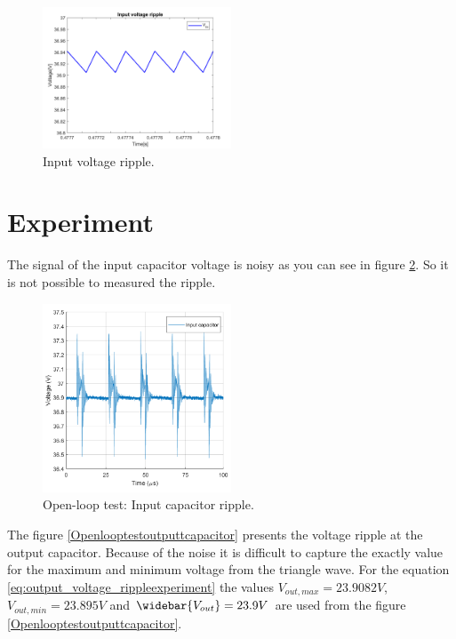 \begin{figure}[H]
	\begin{center}
		\includegraphics[width=0.5\textwidth]{../Pictures/P1/Open_loop_simulation/open_loop_Vin_ripple.png}
		\caption{Input voltage ripple.}
		\label{fig:input_voltage_ripple}
	\end{center}	
\end{figure}

\section{Experiment}

The signal of the input capacitor voltage is noisy as you can see in figure \ref{Openlooptestinputcapacitor}. So it is not possible to measured the ripple.

\begin{figure}[H]
	\begin{center}
		\includegraphics[width=0.5\textwidth]{../Pictures/P1/Test/Openloopinputcapacitor}
		\caption{Open-loop test: Input capacitor ripple.}
		\label{Openlooptestinputcapacitor}
	\end{center}	
\end{figure}

The figure \ref{Openlooptestoutputtcapacitor} presents the voltage ripple at the output capacitor. Because of the noise it is difficult to capture the exactly value for the maximum and minimum voltage from the triangle wave. For the equation \ref{eq:output_voltage_rippleexperiment} the values $V_{out,max} = 23.9082V$, $V_{out,min} = 23.895V$ and $\widebar{V_{out}} = 23.9V$ are used from the figure  \ref{Openlooptestoutputtcapacitor}.

